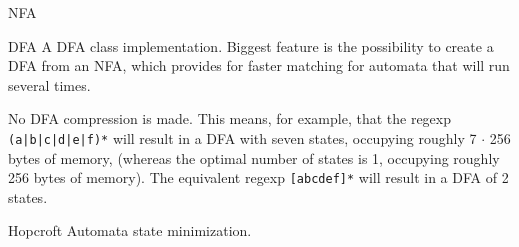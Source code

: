 
\begin{algorithm}{NFA}
\end{algorithm}

\begin{algorithm}{DFA}
\desc
A DFA class implementation. Biggest feature is the possibility to create a
DFA from an NFA, which provides for faster matching for automata that will
run several times.

No DFA compression is made. This means, for example, that the regexp
{\tt (a|b|c|d|e|f)*} will result in a DFA with seven states, occupying
roughly 7 $\cdot$ 256 bytes of memory, (whereas the optimal number of states
is 1, occupying roughly 256 bytes of memory). The equivalent regexp
{\tt [abcdef]*} will result in a DFA of 2 states.
\end{algorithm}

\begin{algorithm}{Hopcroft}
\desc
Automata state minimization.
\end{algorithm}
